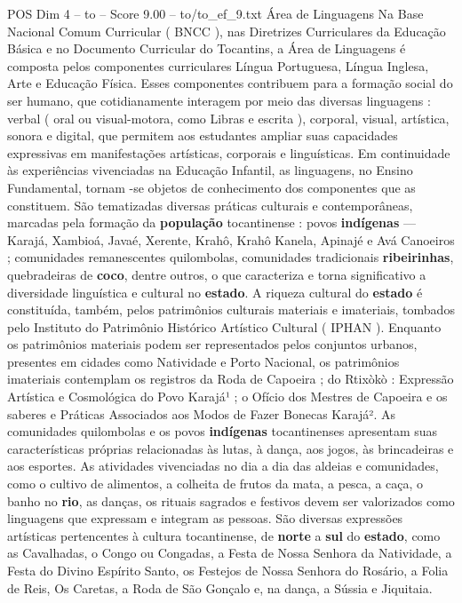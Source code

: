 \begin{textsample}{POS Dim 4 – to – Score 9.00 – to/to\_ef\_9.txt}  \label{ex:f4_pos_204}
Área de Linguagens Na Base Nacional Comum Curricular ( BNCC ), nas Diretrizes Curriculares da Educação Básica e no Documento Curricular do Tocantins, a Área de Linguagens é composta pelos componentes curriculares Língua Portuguesa, Língua Inglesa, Arte e Educação Física.
Esses componentes contribuem para a formação social do ser humano, que cotidianamente interagem por meio das diversas linguagens : verbal ( oral ou visual-motora, como Libras e escrita ), corporal, visual, artística, sonora e digital, que permitem aos estudantes ampliar suas capacidades expressivas em manifestações artísticas, corporais e linguísticas.
Em continuidade às experiências vivenciadas na Educação Infantil, as linguagens, no Ensino Fundamental, tornam -se objetos de conhecimento dos componentes que as constituem.
São tematizadas diversas práticas culturais e contemporâneas, marcadas pela formação da \textbf{população} tocantinense : povos \textbf{indígenas} — Karajá, Xambioá, Javaé, Xerente, Krahô, Krahô Kanela, Apinajé e Avá Canoeiros ; comunidades remanescentes quilombolas, comunidades tradicionais \textbf{ribeirinhas}, quebradeiras de \textbf{coco}, dentre outros, o que caracteriza e torna significativo a diversidade linguística e cultural no \textbf{estado}.
A riqueza cultural do \textbf{estado} é constituída, também, pelos patrimônios culturais materiais e imateriais, tombados pelo Instituto do Patrimônio Histórico Artístico Cultural ( IPHAN ).
Enquanto os patrimônios materiais podem ser representados pelos conjuntos urbanos, presentes em cidades como Natividade e Porto Nacional, os patrimônios imateriais contemplam os registros da Roda de Capoeira ; do Rtixòkò : Expressão Artística e Cosmológica do Povo Karajá¹ ; o Ofício dos Mestres de Capoeira e os saberes e Práticas Associados aos Modos de Fazer Bonecas Karajá².
As comunidades quilombolas e os povos \textbf{indígenas} tocantinenses apresentam suas características próprias relacionadas às lutas, à dança, aos jogos, às brincadeiras e aos esportes.
As atividades vivenciadas no dia a dia das aldeias e comunidades, como o cultivo de alimentos, a colheita de frutos da mata, a pesca, a caça, o banho no \textbf{rio}, as danças, os rituais sagrados e festivos devem ser valorizados como linguagens que expressam e integram as pessoas.
São diversas expressões artísticas pertencentes à cultura tocantinense, de \textbf{norte} a \textbf{sul} do \textbf{estado}, como as Cavalhadas, o Congo ou Congadas, a Festa de Nossa Senhora da Natividade, a Festa do Divino Espírito Santo, os Festejos de Nossa Senhora do Rosário, a Folia de Reis, Os Caretas, a Roda de São Gonçalo e, na dança, a Sússia e Jiquitaia.

\end{textsample}
